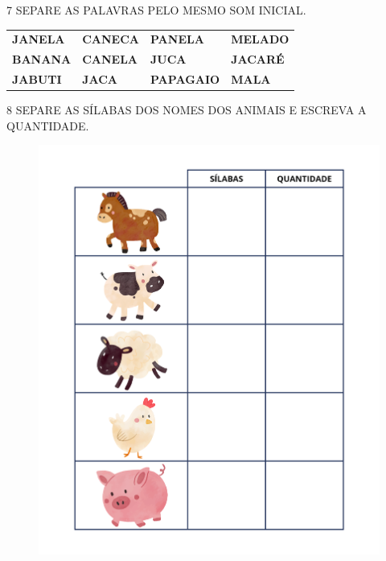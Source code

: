 \num{7} SEPARE AS PALAVRAS PELO MESMO SOM INICIAL.

\begin{longtable}[]{@{}llll@{}}
\toprule
\textbf{JANELA} & \textbf{CANECA} & \textbf{PANELA} &
\textbf{MELADO}\tabularnewline
\textbf{BANANA} & \textbf{CANELA} & \textbf{JUCA} &
\textbf{JACARÉ}\tabularnewline
\textbf{JABUTI} & \textbf{JACA} & \textbf{PAPAGAIO} &
\textbf{MALA}\tabularnewline
\bottomrule
\end{longtable}

\begin{mdframed}[linewidth=2pt,linecolor=salmao,roundcorner=2pt]
\vspace{5.5cm}
\end{mdframed}

\num{8} SEPARE AS SÍLABAS DOS NOMES DOS ANIMAIS E
ESCREVA A QUANTIDADE. 

\begin{figure}[H]
\centering
\includegraphics[width=\textwidth]{media/image26a28.png}
\end{figure}


